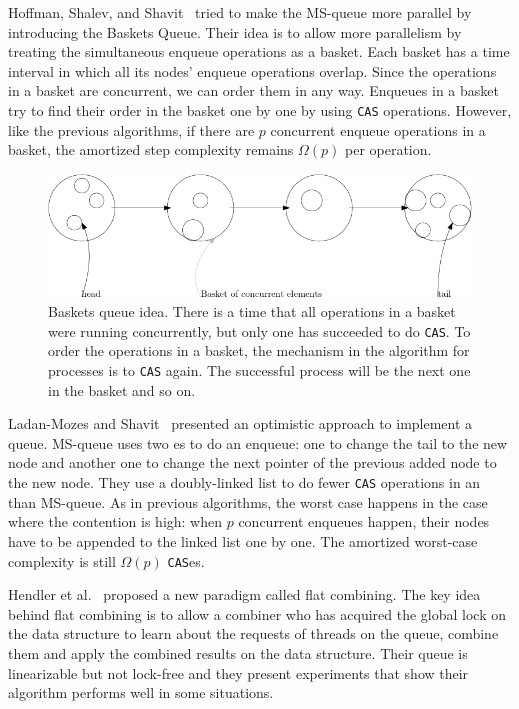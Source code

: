 \documentclass[10pt]{article}
\renewcommand{\bf}[1]{\textbf{#1}}
\newcommand{\nf}[1]{{\normalfont{\texttt{#1}}}}
\theoremstyle{definition}
\begin{document}
Hoffman, Shalev, and Shavit~\cite{DBLP:conf/opodis/HoffmanSS07} tried to make the MS-queue more parallel by introducing the Baskets Queue. Their idea is to allow more parallelism by treating the simultaneous enqueue operations as a basket. Each basket has a time interval in which all its nodes' enqueue operations overlap. Since the operations in a basket are concurrent, we can order them in any way. Enqueues in a basket try to find their order in the basket one by one by using \texttt{CAS} operations. However, like the previous algorithms, if there are $p$ concurrent enqueue operations in a basket, the amortized step complexity remains $\Omega(p)$ per operation.

\begin{figure}[hbt]
  \center\includegraphics[scale=0.3]{pics/baskets}
  \caption{Baskets queue idea. There is a time that all operations in a basket were running concurrently, but only one has succeeded to do \texttt{CAS}. To order the operations in a basket, the mechanism in the algorithm for processes is to \texttt{CAS} again. The successful process will be the next one in the basket and so on.}
\end{figure}

Ladan-Mozes and Shavit~\cite{DBLP:journals/dc/Ladan-MozesS08} presented an optimistic approach to implement a queue. MS-queue uses two \nf{CAS}es to do an enqueue: one to change the tail to the new node and another one to change the next pointer of the previous added node to the new node. They use a doubly-linked list to do fewer \texttt{CAS} operations in an \nf{Enqueue} than MS-queue. As in  previous algorithms, the worst case happens in the case where the contention is high: when $p$ concurrent enqueues happen, their nodes have to be appended to the linked list one by one. The amortized worst-case complexity is still $\Omega(p)$ \texttt{CAS}es.

Hendler et al.~\cite{DBLP:conf/spaa/HendlerIST10} proposed a new paradigm called flat combining. The key idea behind flat combining is to allow a combiner who has acquired the global lock on the data structure to learn about the requests of threads on the queue, combine them and apply the combined results on the data structure. Their queue is linearizable but not lock-free and they present experiments that show their algorithm performs well in some situations.
\end{document}
